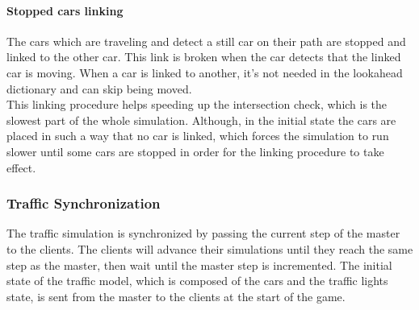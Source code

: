 \documentclass[12pt]{article}
\begin{document}
\paragraph{Stopped cars linking}
The cars which are traveling and detect a still car on their path are stopped and linked to the other car. This link is broken when the car detects that the linked car is moving. When a car is linked to another, it's not needed in the lookahead dictionary and can skip being moved. \\
This linking procedure helps speeding up the intersection check, which is the slowest part of the whole simulation. Although, in the initial state the cars are placed in such a way that no car is linked, which forces the simulation to run slower until some cars are stopped in order for the linking procedure to take effect.

\subsubsection{Traffic Synchronization}
The traffic simulation is synchronized by passing the current step of the master to the clients. The clients will advance their simulations until they reach the same step as the master, then wait until the master step is incremented. The initial state of the traffic model, which is composed of the cars and the traffic lights state, is sent from the master to the clients at the start of the game.

\clearpage
\end{document}
